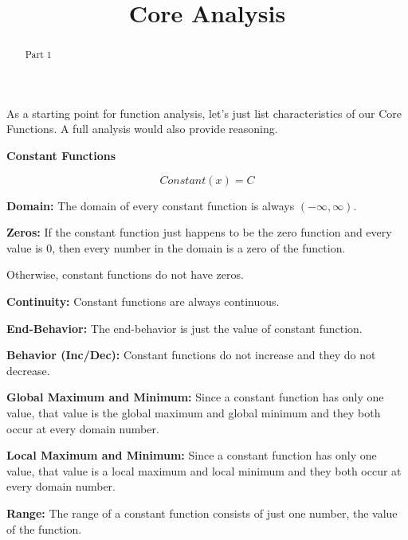\documentclass{ximera}
\title{Core Analysis}
\begin{document}
\begin{abstract}
Part 1
\end{abstract}
\maketitle




As a starting point for function analysis, let's just list characteristics of our Core Functions. A full analysis would also provide reasoning.


\begin{explanation} \textbf{\textcolor{red!75!green}{Constant Functions}} 


\[ Constant(x) = C  \]



\textbf{Domain:} The domain of every constant function is always $(-\infty, \infty)$.

\textbf{Zeros:} If the constant function just happens to be the zero function and every value is $0$, then every number in the domain is a zero of the function.

Otherwise, constant functions do not have zeros.

\textbf{Continuity:} Constant functions are always continuous.

\textbf{End-Behavior:} The end-behavior is just the value of constant function.


\textbf{Behavior (Inc/Dec):} Constant functions do not increase and they do not decrease.

\textbf{Global Maximum and Minimum:} Since a constant function has only one value, that value is the global maximum and global minimum and they both occur at every domain number.

\textbf{Local Maximum and Minimum:}  Since a constant function has only one value, that value is a local maximum and local minimum and they both occur at every domain number.

\textbf{Range:} The range of a constant function consists of just one number, the value of the function.

\end{explanation}
\end{document}

